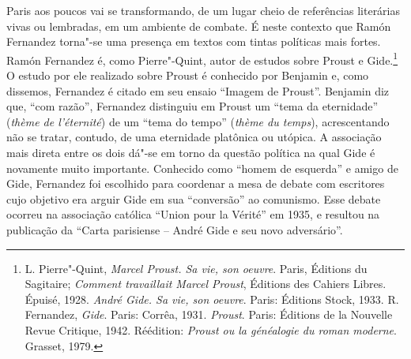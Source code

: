Paris aos poucos vai se transformando, de um lugar cheio de referências
literárias vivas ou lembradas, em um ambiente de combate. É neste
contexto que Ramón Fernandez torna"-se uma presença em textos com tintas
políticas mais fortes. Ramón Fernandez é, como Pierre"-Quint, autor de
estudos sobre Proust e Gide.\footnote{L. Pierre"-Quint, \emph{Marcel %
  Proust. Sa vie, son oeuvre}. Paris, Éditions du Sagitaire;
  \emph{Comment travaillait Marcel Proust}, Éditions des Cahiers Libres.
  Épuisé, 1928. \emph{André Gide. Sa vie, son oeuvre}. Paris: Éditions
  Stock, 1933. R. Fernandez, \emph{Gide}. Paris: Corrêa, 1931.
  \emph{Proust}. Paris: Éditions de la Nouvelle Revue Critique, 1942.
  Réédition: \emph{Proust ou la généalogie du roman moderne}. Grasset,
  1979.} O estudo por ele realizado sobre Proust é conhecido por
Benjamin e, como dissemos, Fernandez é citado em seu ensaio ``Imagem de
Proust''. Benjamin diz que, ``com razão'', Fernandez distinguiu em
Proust um ``tema da eternidade'' (\emph{thème de l'éternité}) de um
``tema do tempo'' (\emph{thème du temps}), acrescentando não se tratar,
contudo, de uma eternidade platônica ou utópica. A associação mais
direta entre os dois dá"-se em torno da questão política na qual Gide é
novamente muito importante. Conhecido como ``homem de esquerda'' e amigo
de Gide, Fernandez foi escolhido para coordenar a mesa de debate com
escritores cujo objetivo era arguir Gide em sua ``conversão'' ao
comunismo. Esse debate ocorreu na associação católica ``Union pour la
Vérité'' em 1935, e resultou na publicação da ``Carta parisiense  --
André Gide e seu novo adversário''.

